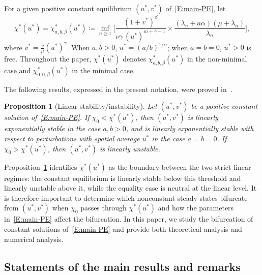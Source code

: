 \documentclass[11pt]{article} %
\newtheorem{proposition}{Proposition}[section]
\theoremstyle{remark}
\theoremstyle{remark}
\numberwithin{equation}{section}
\numberwithin{figure}{section}
\numberwithin{table}{section}
\begin{document}
For a given positive constant equilibrium $(u^*,v^*)$ of~\eqref{E:main-PE}, let
\begin{equation}\label{E:chi-star}
  \chi^*(u^*)= \chi_{a,b,\beta}^*(u^*) \coloneqq \inf_{n\ge
  1}\Big[\frac{(1+v^*)^\beta}{\nu\gamma\,(u^*)^{m+\gamma-1}} \times
  \frac{(\lambda_n + a\alpha)(\mu+\lambda_n)}{\lambda_n}\Big],
\end{equation}
where $v^* = \frac{\nu}{\mu}(u^*)^\gamma$. When $a, b > 0$, $u^* =
(a/b)^{1/\alpha}$; when $a = b = 0$, $u^* > 0$ is free. Throughout the paper,
$\chi^*(u^*)$ denotes $\chi_{a,b,\beta}^*(u^*)$ in the non-minimal case and
$\chi_{0,0,\beta}^*(u^*)$ in the minimal case.


The following results, expressed in the present notation, were proved
in~\cite{chen.ruau.ea:26:chemotaxis}.

\begin{proposition}[Linear stability/instability]\label{P:review-prop-2}
  Let $(u^*,v^*)$ be a positive constant solution of~\eqref{E:main-PE}. If
  $\chi_0 < \chi^*(u^*)$, then $(u^*, v^*)$ is linearly exponentially stable in
  the case $a, b > 0$, and is linearly exponentially stable with respect to
  perturbations with spatial average $u^*$ in the case $a = b = 0$. If $\chi_0 >
  \chi^*(u^*)$, then $(u^*,v^*)$ is linearly unstable.
\end{proposition}


Proposition~\ref{P:review-prop-2} identifies $\chi^*(u^*)$ as the boundary
between the two strict linear regimes: the constant equilibrium is linearly
stable below this threshold and linearly unstable above it, while the equality
case is neutral at the linear level. It is therefore important to determine
which nonconstant steady states bifurcate from $(u^*,v^*)$ when $\chi_0$ passes
through $\chi^*(u^*)$ and how the parameters in~\eqref{E:main-PE} affect the
bifurcation. In this paper, we study the bifurcation of constant solutions
of~\eqref{E:main-PE} and provide both theoretical analysis and numerical
analysis.


\subsection{Statements of the main results and remarks}
\end{document}
